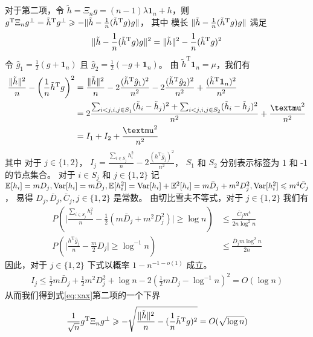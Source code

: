 对于第二项，令  $\tilde{h}=\Xi_n g
=(n-1)\lambda\mathbf{1}_n+h$，则
$g^{\mathrm{T}} \Xi_n g^{\perp} = \tilde{h}^{\mathrm{T}} g^{\perp} \geqslant -\lVert\tilde{h}-\frac{1}{n}(\tilde{h}^{\mathrm{T}}g)g\rVert$，
其中 模长 $\lVert\tilde{h}-\frac{1}{n}(\tilde{h}^{\mathrm{T}}g)g\rVert$ 满足
\begin{align*}
    \lVert\tilde{h}-\frac{1}{n}(\tilde{h}^{\mathrm{T}}g)g\rVert^2
    =\lVert\tilde{h}\rVert^2 - \frac{1}{n}(\tilde{h}^{\mathrm{T}}g)^2
\end{align*}
令 $\hat{g}_1 = \frac{1}{2}(g + \mathbf{1}_n)$ 且
$\hat{g}_2 = \frac{1}{2}(-g +\mathbf{1}_n)$。
由 $\tilde{h}^{\mathrm{T}}\mathbf{1}_n=\mu$，我们有
\begin{align*}
    \frac{\norm{\tilde{h}}^2}{n} - \left(\frac{1}{n}\tilde{h}^{\mathrm{T}}g \right)^2
    &=\frac{\norm{\tilde{h}}^2}{n} - 2\frac{(\tilde{h}^{\mathrm{T}} \hat{g}_1)^2}{n^2} - 2\frac{(\tilde{h}^{\mathrm{T}} \hat{g}_2)^2}{n^2} + \frac{(\tilde{h}^{\mathrm{T}}\mathbf{1}_n)^2}{n^2} \\
    &=2\frac{ \sum_{i<j,i,j\in S_1} (\tilde{h}_i - \tilde{h}_j)^2 + \sum_{i<j,i,j\in S_2} (\tilde{h}_i - \tilde{h}_j)^2 }{n^2}+ \frac{\mu^2}{n^2}\\
    & = I_1 + I_2 + \frac{\mu^2}{n^2}
\end{align*}
其中 对于 $j\in\{1,2\}$，
$I_j=\frac{\sum_{i\in S_j} h_i^2}{n} - 2\frac{(h^{\mathrm{T}} \hat{g}_j)^2}{n^2}$， 
$S_1$ 和 $S_2$ 分别表示标签为 1 和 -1 的节点集合。
对于 $i\in S_j$ 和 $j\in\{1,2\}$
记 $\mathbb{E}[h_i]=m D_j, \operatorname{\mathrm{Var}}[h_i]=m \bar{D}_j, 
\mathbb{E}[h_i^2]=\operatorname{\mathrm{Var}}[h_i]+\mathbb{E}^2[h_i]=m \bar{D}_j+m^2 D^2_j, \operatorname{\mathrm{Var}}[h_i^2] \leqslant m^4 \bar{C}_j$，
易得
$D_j,\bar{D}_j, \bar{C}_j,j\in\{1,2\}$ 是常数。
由切比雪夫不等式，对于 $j\in\{1,2\}$
我们有
\begin{align*}
    P\left(\Big| \frac{\sum_{i\in S_j} h_i^2}{n} - \frac{1}{2}(m \bar{D}_j + m^2D_j^2) \Big| \geq \log n \right)
    & \leq \frac{\bar{C}_j m^4}{2n\log^2 n} \\
    P\left(\Big| \frac{h^{\mathrm{T}} \hat{g}_j}{n} - \frac{m}{2}D_j\Big| \geq \log^{-1} n \right)
    & \leq \frac{\bar{D}_j m \log^{2} n}{2n}
\end{align*}
因此，对于 $j\in\{1,2\}$ 下式以概率 $1-n^{-1-o(1)}$ 成立。
\begin{align*}
    I_j \leq \frac{1}{2}m\bar{D}_j + \frac{1}{2}m^2 D_j^2 + \log n - 2(\frac{1}{2}m D_j - \log^{-1} n)^2 = O(\log n)
\end{align*}
从而我们得到式\eqref{eq:xax}第二项的一个下界
$$
\frac{1}{\sqrt{n}} g^{\mathrm{T}} \Xi_n g^{\perp} \geqslant -\sqrt{\frac{\lVert\tilde{h}\rVert^2}{n} - (\frac{1}{n}\tilde{h}^{\mathrm{T}}g)^2} = O(\sqrt{\log n})
$$
